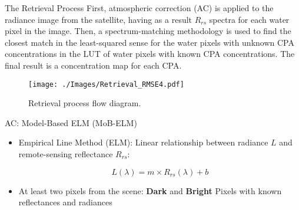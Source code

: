 \documentclass{beamer}
\begin{document}
\begin{frame}{}
\begin{columns}[t]
 \begin{column}{.32\linewidth}  %
\begin{block}{The Retrieval Process}
\justifying\small First, atmospheric correction (AC) is applied to the radiance image from the satellite, having as a result $R_{rs}$ spectra for each water pixel in the image. Then, a spectrum-matching methodology is used to find the closest match in the least-squared sense for the water pixels with unknown CPA concentrations in the LUT of water pixels with known CPA concentrations. The final result is a concentration map for each CPA.
\begin{center}
\begin{figure}[htbp!]
  \centering
    \texttt{[image: ./Images/Retrieval\_RMSE4.pdf]}
    \caption{Retrieval process flow diagram.   \label{fig:retrieval} }
\end{figure}
\end{center}
\end{block}




\begin{block}{AC: Model-Based ELM (MoB-ELM)}

\begin{itemize}
  \item \small Empirical Line Method (ELM): Linear relationship between radiance $L$ and remote-sensing reflectance $R_{rs}$:

\begin{equation*}
  L(\lambda)=m\times R_{rs}(\lambda)+b
\end{equation*}

\vspace{.85cm}
\item \small At least two pixels from the scene: {\bf \small Dark} and {\bf \small Bright} Pixels with known reflectances and radiances

\end{itemize}

\begin{figure}[htb]
  \centering
{}
\end{figure}
\end{block}
\end{column}
\end{columns}
\end{frame}
\end{document}
